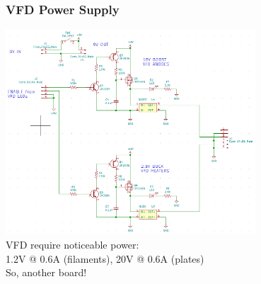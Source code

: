 \documentclass{beamer}
\newcommand{\tred}[1]{\textcolor{my-red}{#1}}
\newcommand{\tgreen}[1]{\textcolor{my-green}{#1}}
\newcommand{\tblue}[1]{\textcolor{my-blue}{#1}}
\begin{document}
\begin{frame}
  \frametitle{VFD Power Supply}
  \vskip -0.2in
  \includegraphics[width=0.7\textwidth]{figs/vfd-ps-schem.png} \\
  \scriptsize
  \tblue{VFD require noticeable power:} \\
  \tred{1.2V @ 0.6A (filaments), 20V @ 0.6A (plates)} \\
  \tgreen{So, another board!}
\end{frame}
\end{document}

